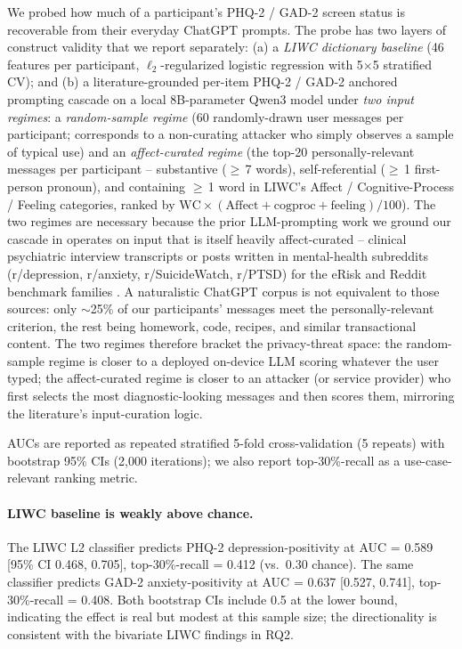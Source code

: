 \documentclass[letterpaper]{article}
\begin{document}
We probed how much of a participant's PHQ-2 / GAD-2 screen status is recoverable from their everyday ChatGPT prompts. The probe has two layers of construct validity that we report separately: (a) a \emph{LIWC dictionary baseline} (46 features per participant, $\ell_2$-regularized logistic regression with 5$\times$5 stratified CV); and (b) a literature-grounded per-item PHQ-2 / GAD-2 anchored prompting cascade on a local 8B-parameter Qwen3 model \citep{qwen3,galatzer2025llamadrs} under \emph{two input regimes}: a \emph{random-sample regime} (60 randomly-drawn user messages per participant; corresponds to a non-curating attacker who simply observes a sample of typical use) and an \emph{affect-curated regime} (the top-20 personally-relevant messages per participant -- substantive ($\geq$\,7 words), self-referential ($\geq$\,1 first-person pronoun), and containing $\geq$\,1 word in LIWC's Affect / Cognitive-Process / Feeling categories, ranked by $\mathrm{WC} \times (\mathrm{Affect} + \mathrm{cogproc} + \mathrm{feeling})/100$). The two regimes are necessary because the prior LLM-prompting work we ground our cascade in operates on input that is itself heavily affect-curated -- clinical psychiatric interview transcripts \citep{galatzer2025llamadrs} or posts written in mental-health subreddits (r/depression, r/anxiety, r/SuicideWatch, r/PTSD) for the eRisk \citep{parapar2024erisk,parapar2025erisk} and Reddit benchmark families \citep{xu2024mentalllm,yang2024mentallama,sadeghi2025cognitive}. A naturalistic ChatGPT corpus is not equivalent to those sources: only $\sim$25\% of our participants' messages meet the personally-relevant criterion, the rest being homework, code, recipes, and similar transactional content. The two regimes therefore bracket the privacy-threat space: the random-sample regime is closer to a deployed on-device LLM scoring whatever the user typed; the affect-curated regime is closer to an attacker (or service provider) who first selects the most diagnostic-looking messages and then scores them, mirroring the literature's input-curation logic.

AUCs are reported as repeated stratified 5-fold cross-validation (5 repeats) with bootstrap 95\% CIs (2{,}000 iterations); we also report top-30\%-recall as a use-case-relevant ranking metric.

\paragraph{LIWC baseline is weakly above chance.} The LIWC L2 classifier predicts PHQ-2 depression-positivity at AUC = 0.589 [95\% CI 0.468, 0.705], top-30\%-recall = 0.412 (vs.\ 0.30 chance). The same classifier predicts GAD-2 anxiety-positivity at AUC = 0.637 [0.527, 0.741], top-30\%-recall = 0.408. Both bootstrap CIs include 0.5 at the lower bound, indicating the effect is real but modest at this sample size; the directionality is consistent with the bivariate LIWC findings in RQ2.
\end{document}
